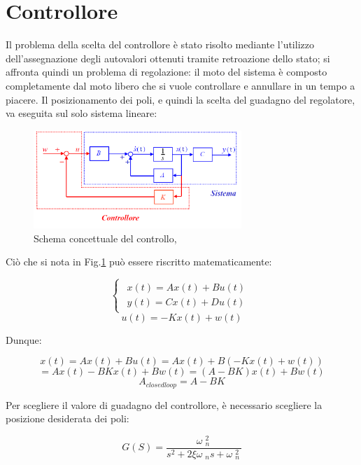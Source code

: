 \section{Controllore}
Il problema della scelta del controllore è stato risolto mediante l'utilizzo dell'assegnazione degli autovalori ottenuti tramite retroazione dello stato; si affronta quindi un problema di regolazione: il moto del sistema è composto completamente dal moto libero che si vuole controllare e annullare in un tempo a piacere. Il posizionamento dei poli, e quindi la scelta del guadagno del regolatore, va eseguita sul solo sistema lineare:
\begin{figure}[H]
	\centering   	
	\includegraphics[width=0.70\textwidth]{Immagini/feedback_state.png}
	\caption{Schema concettuale del controllo,\cite{feedback_state}}
	\label{fig:feedback_state}
\end{figure}
Ciò che si nota in Fig.\ref{fig:feedback_state} può essere riscritto matematicamente:
\begin{center}
	$$
	\begin{cases}
	\begin{array}{c}
	x\left(t\right)=Ax{\left(t\right)}+Bu\left(t\right)\\
	y{\left(t\right)}=Cx{\left(t\right)}+Du\left(t\right)
	\end{array}
	\end{cases}
	$$
	$$
	u{\left(t\right)}=-Kx{\left(t\right)}+w{\left(t\right)}	
	$$
\end{center}Dunque:
\begin{center}
	
	$$
	x{\left(t\right)}=Ax{\left(t\right)}+Bu{\left(t\right)}=Ax{\left(t\right)}+B{\left(-Kx{\left(t\right)}+w{\left(t\right)}\right)}
	$$
	$$
	=Ax{\left(t\right)}-BKx{\left(t\right)}+Bw\left(t\right)={\left(A-BK\right)}x{\left(t\right)}+Bw{\left(t\right)}
	$$
	$$
	A_{closedloop} =A-BK
	$$
\end{center}
Per scegliere il valore di guadagno del controllore, è necessario scegliere la posizione desiderata dei poli:
\begin{center}
	$$
	G{\left(S\right)}=\frac{\omega {\;}_n^{2\;} }{s^2 +2\xi \omega {\;}_n s+\omega {\;}_n^{2\;} }
	$$
\end{center}
